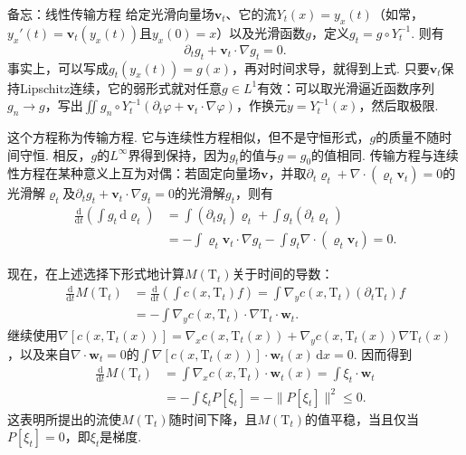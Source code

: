 \begin{sourcebox}{备忘：线性传输方程}\label{box:6.3}
给定光滑向量场$\mathbf v_t$、它的流$Y_t(x)=y_x(t)$（如常，$y_x'(t)=\mathbf v_t(y_x(t))$且$y_x(0)=x$）以及光滑函数$g$，定义$g_t=g\circ Y_t^{-1}$. 则有
\[
\partial_tg_t+\mathbf v_t\cdot\nabla g_t=0.
\]
事实上，可以写成$g_t(y_x(t))=g(x)$，再对时间求导，就得到上式. 只要$\mathbf v_t$保持Lipschitz连续，它的弱形式就对任意$g\in L^1$有效：可以取光滑逼近函数序列$g_n\to g$，写出$\iint g_n\circ Y_t^{-1}(\partial_t\varphi+\mathbf v_t\cdot\nabla\varphi)$，作换元$y=Y_t^{-1}(x)$，然后取极限.

这个方程称为传输方程. 它与连续性方程相似，但不是守恒形式，$g$的质量不随时间守恒. 相反，$g$的$L^\infty$界得到保持，因为$g_t$的值与$g=g_0$的值相同. 传输方程与连续性方程在某种意义上互为对偶：若固定向量场$\mathbf v$，并取$\partial_t\varrho_t+\nabla\cdot(\varrho_t\mathbf v_t)=0$的光滑解$\varrho_t$及$\partial_tg_t+\mathbf v_t\cdot\nabla g_t=0$的光滑解$g_t$，则有
\[
\begin{aligned}
\frac{\mathrm d}{\mathrm dt}\left(\int g_t\,\mathrm d\varrho_t\right)
&=\int(\partial_tg_t)\varrho_t+\int g_t(\partial_t\varrho_t)\\
&=-\int\varrho_t\mathbf v_t\cdot\nabla g_t
-\int g_t\nabla\cdot(\varrho_t\mathbf v_t)=0.
\end{aligned}
\]
\end{sourcebox}

现在，在上述选择下形式地计算$M(\mathrm T_t)$关于时间的导数：
\[
\begin{aligned}
\frac{\mathrm d}{\mathrm dt}M(\mathrm T_t)
&=\frac{\mathrm d}{\mathrm dt}\left(\int c(x,\mathrm T_t)f\right)
=\int\nabla_yc(x,\mathrm T_t)(\partial_t\mathrm T_t)f\\
&=-\int\nabla_yc(x,\mathrm T_t)\cdot\nabla\mathrm T_t\cdot\mathbf w_t.
\end{aligned}
\]
继续使用$\nabla[c(x,\mathrm T_t(x))]=\nabla_xc(x,\mathrm T_t(x))+\nabla_yc(x,\mathrm T_t(x))\nabla\mathrm T_t(x)$，以及来自$\nabla\cdot\mathbf w_t=0$的$\int\nabla[c(x,\mathrm T_t(x))]\cdot\mathbf w_t(x)\,\mathrm dx=0$. 因而得到
\[
\begin{aligned}
\frac{\mathrm d}{\mathrm dt}M(\mathrm T_t)
&=\int\nabla_xc(x,\mathrm T_t)\cdot\mathbf w_t(x)
=\int\xi_t\cdot\mathbf w_t\\
&=-\int\xi_tP[\xi_t]=-\|P[\xi_t]\|^2\le0.
\end{aligned}
\]
这表明所提出的流使$M(\mathrm T_t)$随时间下降，且$M(\mathrm T_t)$的值平稳，当且仅当$P[\xi_t]=0$，即$\xi_t$是梯度.

